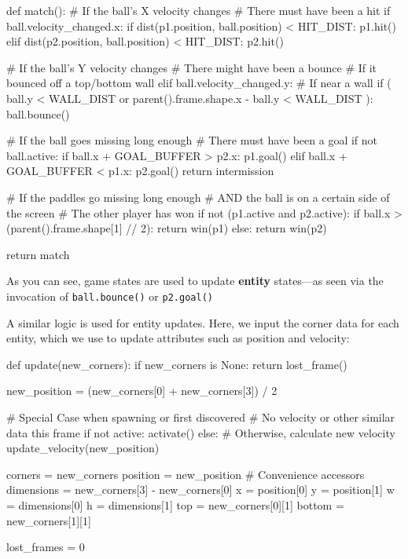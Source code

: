 \documentclass{report}
\newcommand{\state}[1]{\textbf{#1}}
\begin{document}
\begin{codeblock}
def match():
    # If the ball's X velocity changes
    # There must have been a hit
    if ball.velocity_changed.x:
        if dist(p1.position, ball.position) < HIT_DIST:
            p1.hit()
        elif dist(p2.position, ball.position) < HIT_DIST:
            p2.hit()

    # If the ball's Y velocity changes
    # There might have been a bounce
    # If it bounced off a top/bottom wall
    elif ball.velocity_changed.y:
        # If near a wall
        if (
            ball.y < WALL_DIST
            or 
            parent().frame.shape.x - ball.y < WALL_DIST
        ):
            ball.bounce()

    # If the ball goes missing long enough
    # There must have been a goal
    if not ball.active:
        if ball.x + GOAL_BUFFER > p2.x:
            p1.goal()
        elif ball.x + GOAL_BUFFER < p1.x:
            p2.goal()
        return intermission

    # If the paddles go missing long enough
    # AND the ball is on a certain side of the screen
    # The other player has won
    if not (p1.active and p2.active):
        if ball.x > (parent().frame.shape[1] // 2):
            return win(p1)
        else:
            return win(p2)

    return match
\end{codeblock}

As you can see, game states are used to update \state{entity} states---as seen via the invocation of \texttt{ball.bounce()} or \texttt{p2.goal()} 

A similar logic is used for entity updates. Here, we input the corner data for each entity, which we use to update attributes such as position and velocity:

\begin{codeblock}
def update(new_corners):
    if new_corners is None:
        return lost_frame()
    
    new_position = (new_corners[0] + new_corners[3]) / 2

    # Special Case when spawning or first discovered
    # No velocity or other similar data this frame
    if not active:
        activate()
    else: # Otherwise, calculate new velocity 
        update_velocity(new_position)

    corners = new_corners
    position = new_position
    # Convenience accessors
    dimensions = new_corners[3] - new_corners[0]
    x = position[0]
    y = position[1]
    w = dimensions[0]
    h = dimensions[1]
    top = new_corners[0][1]
    bottom = new_corners[1][1]

    lost_frames = 0
\end{codeblock}
\end{document}
